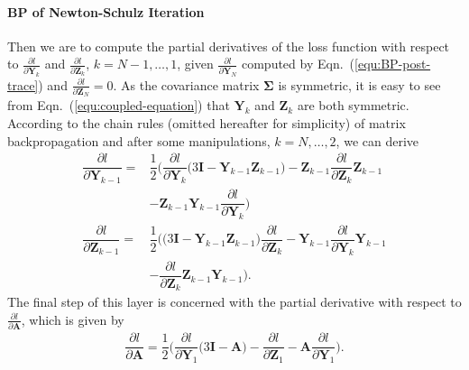 \documentclass[10pt,twocolumn,letterpaper]{article}
\begin{document}
\paragraph{BP of Newton-Schulz Iteration} Then we are to compute the partial derivatives of the loss function with respect to $\frac{\partial l}{\partial \mathbf{Y}_{k}}$ and $\frac{\partial l}{\partial \mathbf{Z}_{k}}$, $k=N-1, \ldots, 1$, given $\frac{\partial l}{\partial \mathbf{Y}_{N}}$ computed by Eqn.~(\ref{equ:BP-post-trace}) and  $\frac{\partial l}{\partial \mathbf{Z}_{N}}=0$. As the covariance matrix $\boldsymbol{\Sigma}$ is symmetric, it is easy to see from Eqn.~(\ref{equ:coupled-equation}) that $\mathbf{Y}_{k}$ and $\mathbf{Z}_{k}$ are both symmetric. According to the chain rules (omitted hereafter  for simplicity) of matrix backpropagation and after some manipulations, $k=N, \ldots, 2$, we can derive
\begin{align}\label{equ:BP-coupled-equations}
\dfrac{\partial l}{\partial \mathbf{Y}_{k-1}}=&\dfrac{1}{2}\Big(\dfrac{\partial l}{\partial \mathbf{Y}_{k}}\Big(3\mathbf{I}-\mathbf{Y}_{k-1}\mathbf{Z}_{k-1}\Big)-\mathbf{Z}_{k-1}\dfrac{\partial l}{\partial \mathbf{Z}_{k}}\mathbf{Z}_{k-1}\nonumber \\
&-\mathbf{Z}_{k-1}\mathbf{Y}_{k-1}\dfrac{\partial l}{\partial \mathbf{Y}_{k}}\Big)\nonumber\\
\dfrac{\partial l}{\partial \mathbf{Z}_{k-1}}=&\dfrac{1}{2}\Big(\Big(3\mathbf{I}-\mathbf{Y}_{k-1}\mathbf{Z}_{k-1}\Big)\dfrac{\partial l}{\partial \mathbf{Z}_{k}}-\mathbf{Y}_{k-1}\dfrac{\partial l}{\partial \mathbf{Y}_{k}}\mathbf{Y}_{k-1}\nonumber\\
&-\dfrac{\partial l}{\partial \mathbf{Z}_{k}}\mathbf{Z}_{k-1}\mathbf{Y}_{k-1}\Big).
\end{align}
The final step of this layer is concerned with the partial derivative with respect to $\frac{\partial l}{\partial \mathbf{A}}$, which is given by
\begin{align}\label{equ:BP-gradient-A}
\dfrac{\partial l}{\partial \mathbf{A}}=\dfrac{1}{2}\Big(\dfrac{\partial l}{\partial \mathbf{Y}_{1}}\Big(3\mathbf{I}-\mathbf{A}\Big)-\dfrac{\partial l}{\partial \mathbf{Z}_{1}}-\mathbf{A}\dfrac{\partial l}{\partial \mathbf{Y}_{1}}\Big).
\end{align}
\end{document}
